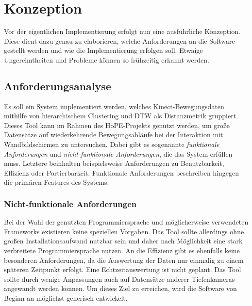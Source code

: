 \chapter{Konzeption}
\label{chapter4}
Vor der eigentlichen Implementierung erfolgt nun eine ausführliche Konzeption.
Diese dient dazu genau zu elaborieren, welche Anforderungen an die Software gestellt werden
und wie die Implementierung erfolgen soll.
Etwaige Ungereimtheiten und Probleme können so frühzeitig erkannt werden.


\section{Anforderungsanalyse}
\label{4-Anforderungsanalyse}
Es soll ein System implementiert werden,
welches Kinect-Bewegungsdaten mithilfe von hierarchischem Clustering
und \ac{DTW} als Distanzmetrik gruppiert.
Dieses Tool kann im Rahmen des HoPE-Projekts genutzt werden,
um große Datensätze auf wiederkehrende Bewegungsabläufe bei der Interaktion mit Wandbildschirmen
zu untersuchen.
Dabei gibt es sogenannte \emph{funktionale Anforderungen} und \emph{nicht-funktionale Anforderungen},
die das System erfüllen muss.
Letztere beinhalten beispielsweise Anforderungen zu Benutzbarkeit, Effizienz oder Portierbarkeit.
Funktionale Anforderungen beschreiben hingegen die primären Features des Systems.

\subsection{Nicht-funktionale Anforderungen}
\label{4-NichtFunktionaleAnforderungen}
Bei der Wahl der genutzten Programmiersprache und möglicherweise verwendeten Frameworks
existieren keine speziellen Vorgaben.
Das Tool sollte allerdings ohne großen Installationsaufwand nutzbar sein
und daher nach Möglichkeit eine stark verbreitete Programmiersprache nutzen.
An die Effizienz gibt es ebenfalls keine besonderen Anforderungen,
da die Auswertung der Daten nur einmalig zu einem späteren Zeitpunkt erfolgt.
Eine Echtzeitauswertung ist nicht geplant.
Das Tool sollte durch wenige Anpassungen auch auf Datensätze anderer Tiefenkameras angewandt werden können.
Um dieses Ziel zu erreichen, wird die Software von Beginn an möglichst generisch entwickelt.

